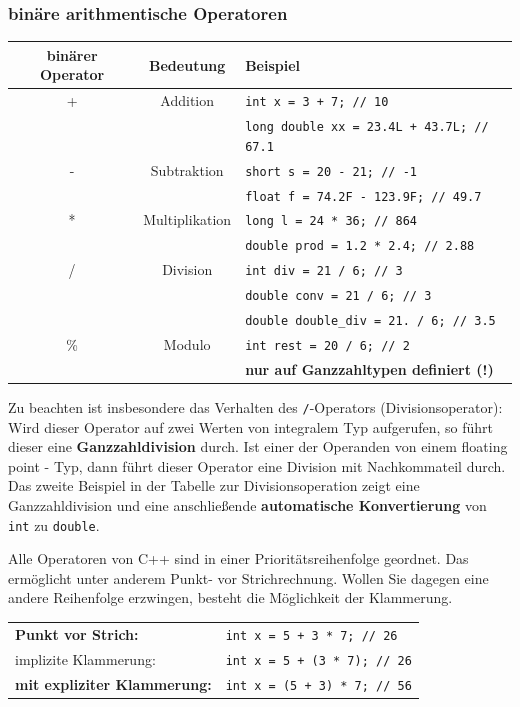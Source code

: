 \documentclass[a4paper]{report}
\begin{document}
\subsubsection{binäre arithmentische Operatoren}
\begin{center}
\begin{tabular}{|c|c|p{8cm}|} \hline
	\textbf{binärer Operator} & \textbf{Bedeutung} & \textbf{Beispiel} \\ \hline
	+ & Addition & \texttt{int x = 3 + 7; // 10} \\
	&& \texttt{long double xx = 23.4L + 43.7L; // 67.1} \\ \hline
	- & Subtraktion & \texttt{short s = 20 - 21; // -1}\\
	&& \texttt{float f = 74.2F - 123.9F; // 49.7} \\ \hline
	* & Multiplikation & \texttt{long l = 24 * 36; // 864}\\
	&& \texttt{double prod = 1.2 * 2.4; // 2.88} \\ \hline
	/ & Division & \texttt{int div = 21 / 6; // 3}\\ 
	&& \texttt{double conv = 21 / 6; // 3} \\
	&& \texttt{double double\_div = 21. / 6; // 3.5} \\ \hline 
	\% & Modulo & \texttt{int rest = 20 / 6; // 2}\\ 
	&& \textbf{nur auf Ganzzahltypen definiert (!)} \\ \hline
\end{tabular}
\end{center}
Zu beachten ist insbesondere das Verhalten des \texttt{/}-Operators (Divisionsoperator): Wird dieser Operator auf zwei Werten von integralem Typ aufgerufen, so führt dieser eine \textbf{Ganzzahldivision} durch. Ist einer der Operanden von einem floating point - Typ, dann führt dieser Operator eine Division mit Nachkommateil durch. Das zweite Beispiel in der Tabelle zur Divisionsoperation zeigt eine Ganzzahldivision und eine anschließende \textbf{automatische Konvertierung} von \texttt{int} zu \texttt{double}.

Alle Operatoren von C++ sind in einer Prioritätsreihenfolge geordnet. Das ermöglicht unter anderem Punkt- vor Strichrechnung. Wollen Sie dagegen eine andere Reihenfolge erzwingen, besteht die Möglichkeit der Klammerung.
\begin{center}
	\begin{tabular}{|l|l|} \hline
		\textbf{Punkt vor Strich:} & \texttt{int x = 5 + 3 * 7; // 26} \\
		\quad implizite Klammerung: & \texttt{int x = 5 + (3 * 7); // 26} \\ \hline
		\textbf{mit expliziter Klammerung:} & \texttt{int x = (5 + 3) * 7; // 56} \\ \hline
	\end{tabular}
\end{center}
\end{document}

